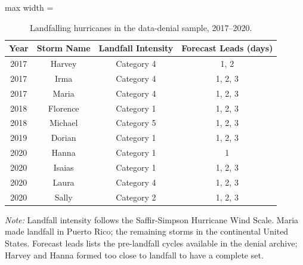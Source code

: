 \begin{table}

  \caption{Landfalling hurricanes in the data-denial sample, 2017--2020. \label{tab:data_denial}}
  \centering
  \begin{adjustbox}{max width = \textwidth}
  \begin{threeparttable}
  \begin{tabular}[t]{cccc}
  \toprule
  Year & Storm Name & Landfall Intensity & Forecast Leads (days)\\
  \midrule
  2017 & Harvey & Category 4 & 1, 2\\
  2017 & Irma & Category 4 & 1, 2, 3\\
  2017 & Maria & Category 4 & 1, 2, 3\\
  2018 & Florence & Category 1 & 1, 2, 3\\
  2018 & Michael & Category 5 & 1, 2, 3\\
  2019 & Dorian & Category 1 & 1, 2, 3\\
  2020 & Hanna & Category 1 & 1\\
  2020 & Isaias & Category 1 & 1, 2, 3\\
  2020 & Laura & Category 4 & 1, 2, 3\\
  2020 & Sally & Category 2 & 1, 2, 3\\
  \bottomrule
  \end{tabular}
  \begin{tablenotes}
  \small
  \item \textit{Note:} Landfall intensity follows the Saffir-Simpson Hurricane Wind Scale. Maria made landfall in Puerto Rico; the remaining storms in the continental United States. Forecast leads lists the pre-landfall cycles available in the denial archive; Harvey and Hanna formed too close to landfall to have a complete set.
  \end{tablenotes}
  \end{threeparttable}
  \end{adjustbox}
  \end{table}
